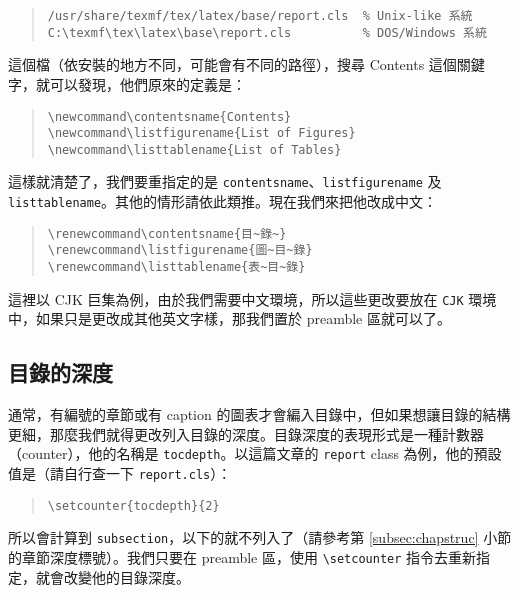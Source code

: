 \begin{quote}
  \begin{verbatim}
/usr/share/texmf/tex/latex/base/report.cls  % Unix-like 系統
C:\texmf\tex\latex\base\report.cls          % DOS/Windows 系統
\end{verbatim}
\end{quote}

這個檔（依安裝的地方不同，可能會有不同的路徑），搜尋 Contents 這個關鍵字，就可以發現，他們原來的定義是：

\begin{quote}
  \begin{verbatim}
\newcommand\contentsname{Contents}
\newcommand\listfigurename{List of Figures}
\newcommand\listtablename{List of Tables}
\end{verbatim}
\end{quote}

這樣就清楚了，我們要重指定的是 \texttt{contentsname}、\texttt{listfigurename} 及 \texttt{listtablename}。其他的情形請依此類推。現在我們來把他改成中文：

\begin{quote}
  \begin{verbatim}
\renewcommand\contentsname{目~錄~}
\renewcommand\listfigurename{圖~目~錄}
\renewcommand\listtablename{表~目~錄}
\end{verbatim}
\end{quote}

這裡以 {\sffamily CJK} 巨集為例，由於我們需要中文環境，所以這些更改要放在 \texttt{CJK} 環境中，如果只是更改成其他英文字樣，那我們置於 preamble 區就可以了。

\subsection{目錄的深度}

通常，有編號的章節或有 caption 的圖表才會編入目錄中，但如果想讓目錄的結構更細，那麼我們就得更改列入目錄的深度。目錄深度的表現形式是一種計數器（counter），他的名稱是 \texttt{tocdepth}。以這篇文章的 \texttt{report} class 為例，他的預設值是（請自行查一下 \texttt{report.cls}）：

\begin{quote}
  \begin{verbatim}
\setcounter{tocdepth}{2}
\end{verbatim}
\end{quote}

所以會計算到 \texttt{subsection}，以下的就不列入了（請參考第 \ref{subsec:chapstruc} 小節的章節深度標號）。我們只要在 preamble 區，使用 \verb|\setcounter| 指令去重新指定，就會改變他的目錄深度。

